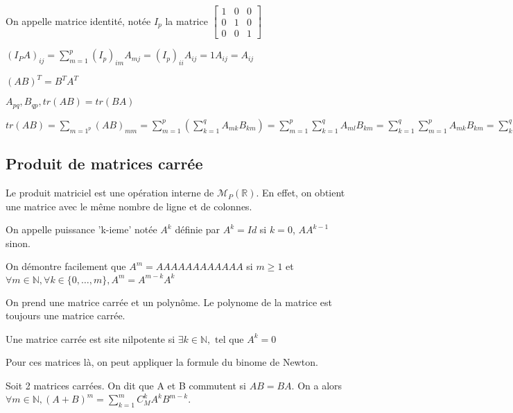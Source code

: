 \documentclass[french]{yLectureNote}
\newcommand{\N}[0]{\mathbb{N}}
\newcommand{\R}[0]{\mathbb{R}}
\newcommand{\tq}[0]{\text{ tel que }}
\newcommand{\mc}{\mathcal}
\begin{document}
\begin{definition}
On appelle matrice identité, notée \(I_p\) la matrice \(\begin{bmatrix}
 1&0&0 \\
 0&1&0 \\
 0&0&1
\end{bmatrix}\)
\end{definition}
\begin{myproof}
 \((I_PA)_{ij} = \sum_{m=1}^p (I_p)_{im} A_{mj} = (I_p)_{ii} A_{ij} = 1 A_{ij} = A_{ij}\)
\end{myproof}
\begin{proposition}
\((AB)^T = B^TA^T\)

\(A_{pq}, B_{qp}, tr(AB) = tr(BA)\)
\end{proposition}
\begin{myproof}
 \(tr(AB) = \sum_{m=1^p }(AB)_{mm} = \sum^p_{m=1} (\sum^q_{k=1}A_{mk} B_{km}) = \sum^p_{m=1}\sum^q_{k=1} A_{ml} B_{km} = \sum^q_{k=1}\sum^p_{m=1} A_{mk}B_{km} = \sum^q_{k=1} (BA)_{kk} = tr(BA)\)
\end{myproof}
\subsection{Produit de matrices carrée}
\begin{proposition}
Le produit matriciel est une opération interne de \(\mc{M}_P(\R)\). En effet, on obtient une matrice avec le m\^eme nombre de ligne et de colonnes.
\end{proposition}
\begin{definition}
On appelle puissance 'k-ieme' notée \(A^k\) définie par \(A^k = Id\) si \(k=0\), \(AA^{k-1}\) sinon.
\end{definition}
\begin{myproof}
 On démontre facilement que \(A^m = AAAAAAAAAAAA\) si \(m\geq 1\) et \(\forall m\in \N, \forall k\in \{0,\dots, m\}, A^m = A^{m-k}A^k\)
\end{myproof}
\begin{definition}
On prend une matrice carrée et un polyn\^ome. Le polynome de la matrice est toujours une matrice carrée.
\end{definition}
\begin{definition}
Une matrice carrée est site nilpotente si \(\exists k\in \N, \tq A^k = 0\)
\end{definition}
\begin{definition}
Pour ces matrices là, on peut appliquer la formule du binome de Newton.

Soit 2 matrices carrées. On dit que A et B commutent si \(AB = BA\). On a alors \(\forall m \in \N, (A+B)^m  = \sum^m_{k=1}C^k_M A^kB^{m-k}\).
\end{definition}
\end{document}
